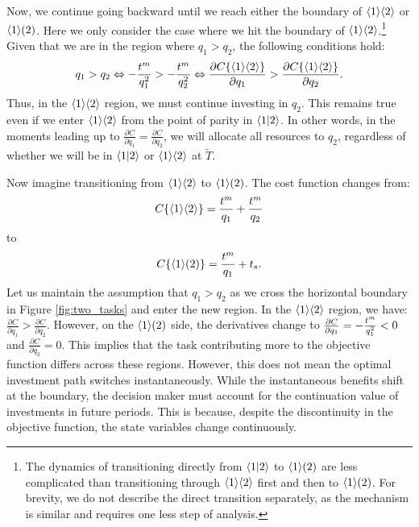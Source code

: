\documentclass{article}
\theoremstyle{plain}
\theoremstyle{plain}
\begin{document}
Now, we continue going backward until we reach either the boundary of $\langle 1 \rangle\langle 2 \rangle$ or $\langle 1 \rangle( 2 )$.  
Here we only consider the case where we hit the boundary of $\langle 1 \rangle\langle 2 \rangle$.\footnote{The dynamics of transitioning directly from $\langle 1|2 \rangle$ to $\langle 1 \rangle( 2 )$ are less complicated than transitioning through $\langle 1 \rangle\langle 2 \rangle$ first and then to $\langle 1 \rangle( 2 )$.  
For brevity, we do not describe the direct transition separately, as the mechanism is similar and requires one less step of analysis.}  
Given that we are in the region where $q_{1}>q_{2}$, the following conditions hold:
\[
q_{1}>q_{2}\Leftrightarrow-\frac{t^{m}_{}}{q_{1}^{2}}>-\frac{t^{m}_{}}{q_{2}^{2}}\Leftrightarrow\frac{\partial C\{\langle 1 \rangle\langle 2 \rangle\}}{\partial q_{1}}>\frac{\partial C\{\langle 1 \rangle\langle 2 \rangle\}}{\partial q_{2}}.
\]
Thus, in the $\langle 1 \rangle\langle 2 \rangle$ region, we must continue investing in $q_{2}$.  
This remains true even if we enter $\langle 1 \rangle\langle 2 \rangle$ from the point of parity in $\langle 1|2 \rangle$.  
In other words, in the moments leading up to $\frac{\partial C}{\partial q_{1}}=\frac{\partial C}{\partial q_{2}}$, we will allocate all resources to $q_{2}$, regardless of whether we will be in $\langle 1|2 \rangle$ or $\langle 1 \rangle\langle 2 \rangle$ at $\tilde{T}$.

Now imagine transitioning from $\langle 1 \rangle\langle 2 \rangle$ to $\langle 1 \rangle( 2 )$.  
The cost function changes from:
\[
C\{\langle 1 \rangle\langle 2 \rangle\}=\frac{t^{m}_{}}{q_{1}}+\frac{t^{m}_{}}{q_{2}}
\]
to 
\[
C\{\langle 1 \rangle( 2 )\}=\frac{t^{m}_{}}{q_{1}}+t_{s}.
\]
Let us maintain the assumption that $q_{1}>q_{2}$ as we cross the horizontal boundary in Figure \ref{fig:two_tasks} and enter the new region.  
In the $\langle 1 \rangle\langle 2 \rangle$ region, we have: $\frac{\partial C}{\partial q_{1}}>\frac{\partial C}{\partial q_{2}}$.  
However, on the $\langle 1 \rangle( 2 )$ side, the derivatives change to $\frac{\partial C}{\partial q_{1}}=-\frac{t^{m}_{}}{q_{1}^{2}}<0$ and $\frac{\partial C}{\partial q_{2}}=0$.  
This implies that the task contributing more to the objective function differs across these regions.  
However, this does not mean the optimal investment path switches instantaneously.  
While the instantaneous benefits shift at the boundary, the decision maker must account for the continuation value of investments in future periods.  
This is because, despite the discontinuity in the objective function, the state variables change continuously.
\end{document}
